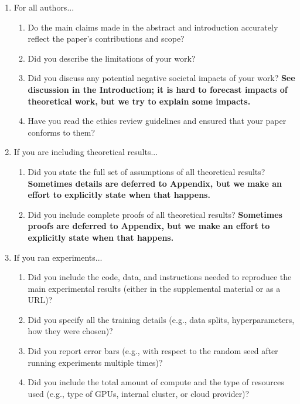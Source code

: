 \documentclass{article} %
\begin{document}
\begin{enumerate}
	
	\item For all authors...
	\begin{enumerate}
		\item Do the main claims made in the abstract and introduction accurately reflect the paper's contributions and scope?
		\answerYes{}
		\item Did you describe the limitations of your work?
		\answerYes{}
		\item Did you discuss any potential negative societal impacts of your work?
		\answerYes{} \textbf{See discussion in the Introduction; it is hard to forecast impacts of theoretical work, but we try to explain some impacts.}
		\item Have you read the ethics review guidelines and ensured that your paper conforms to them?
		\answerYes{}
	\end{enumerate}
	
	\item If you are including theoretical results...
	\begin{enumerate}
		\item Did you state the full set of assumptions of all theoretical results?
		\answerYes{}\textbf{Sometimes details are deferred to Appendix, but we make an effort to explicitly state when that happens.}
		\item Did you include complete proofs of all theoretical results?
		\answerYes{}\textbf{Sometimes proofs are deferred to Appendix, but we make an effort to explicitly state when that happens.}
	\end{enumerate}
	
	\item If you ran experiments...
	\begin{enumerate}
		\item Did you include the code, data, and instructions needed to reproduce the main experimental results (either in the supplemental material or as a URL)?
		\answerNA{}
		\item Did you specify all the training details (e.g., data splits, hyperparameters, how they were chosen)?
		\answerNA{}
		\item Did you report error bars (e.g., with respect to the random seed after running experiments multiple times)?
		\answerNA{}
		\item Did you include the total amount of compute and the type of resources used (e.g., type of GPUs, internal cluster, or cloud provider)?
		\answerNA{}
	\end{enumerate}
	

\end{enumerate}
\end{document}
